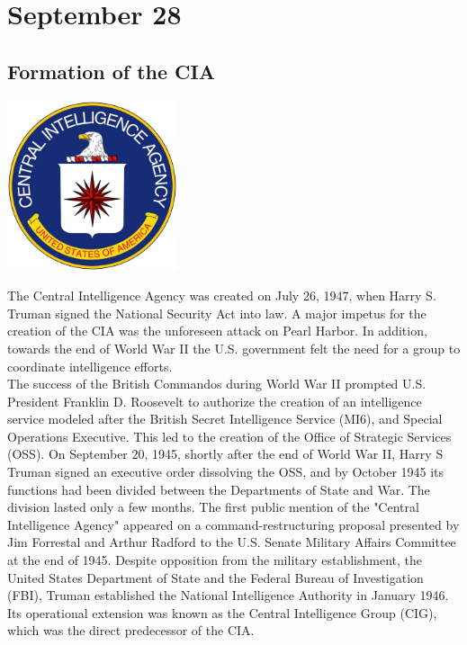 \documentclass[11pt]{report}
\begin{document}
\section{September 28}
\subsection{Formation of the CIA}
\vspace{2mm}\begin{center}\includegraphics[width=5cm]{./img/CIALogo.jpg}\end{center}
The Central Intelligence Agency was created on July 26, 1947, when Harry S. Truman signed the National Security Act into law. A major impetus for the creation of the CIA was the unforeseen attack on Pearl Harbor. In addition, towards the end of World War II the U.S. government felt the need for a group to coordinate intelligence efforts.\\
\indent The success of the British Commandos during World War II prompted U.S. President Franklin D. Roosevelt to authorize the creation of an intelligence service modeled after the British Secret Intelligence Service (MI6), and Special Operations Executive. This led to the creation of the Office of Strategic Services (OSS). On September 20, 1945, shortly after the end of World War II, Harry S Truman signed an executive order dissolving the OSS, and by October 1945 its functions had been divided between the Departments of State and War. The division lasted only a few months. The first public mention of the "Central Intelligence Agency" appeared on a command-restructuring proposal presented by Jim Forrestal and Arthur Radford to the U.S. Senate Military Affairs Committee at the end of 1945. Despite opposition from the military establishment, the United States Department of State and the Federal Bureau of Investigation (FBI), Truman established the National Intelligence Authority in January 1946. Its operational extension was known as the Central Intelligence Group (CIG), which was the direct predecessor of the CIA.
\end{document}
